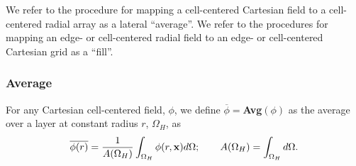 We refer to the procedure for mapping a cell-centered Cartesian field to a
cell-centered radial array as a lateral ``average''.  We refer to the procedures for mapping
an edge- or cell-centered radial field to an edge- or cell-centered Cartesian grid
as a ``fill''.
\subsubsection{Average}\label{Sec:Average}
For any Cartesian cell-centered field, $\phi$, we define 
$\overline{\phi} = ${\bf Avg}$(\phi)$ as the average over a layer at 
constant radius $r$, $\Omega_H$, as
\begin{equation}
\overline{\phi(r)} = \frac{1}{A(\Omega_H)}\int_{\Omega_H}\phi(r,{\bf x})d\Omega; \qquad
A(\Omega_H) = \int_{\Omega_H}d\Omega.
\end{equation}
